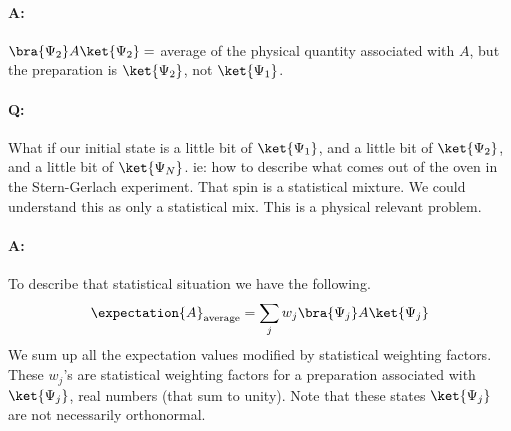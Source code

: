 \paragraph{A:}  \(\bra{\Psi_2} A \ket{\Psi_2} = \) average of the physical quantity associated with \(A\), but the preparation is \(\ket{\Psi_2}\), not \(\ket{\Psi_1}\).

\paragraph{Q:}  What if our initial state is a little bit of \(\ket{\Psi_1}\), and a little bit of \(\ket{\Psi_2}\), and a little bit of \(\ket{\Psi_N}\).  ie: how to describe what comes out of the oven in the Stern-Gerlach experiment.  That spin is a statistical mixture.  We could understand this as only a statistical mix.  This is a physical relevant problem.
\paragraph{A:}  To describe that statistical situation we have the following.
%
\begin{equation}\label{eqn:PHY356HNov2:30}
\begin{aligned}
\expectation{A}_{\text{average}} = \sum_j w_j \bra{\Psi_j} A \ket{\Psi_j}
\end{aligned}
\end{equation}
%
We sum up all the expectation values modified by statistical weighting factors.  These \(w_j\)'s are statistical weighting factors for a preparation associated with \(\ket{\Psi_j}\), real numbers (that sum to unity).  Note that these states \(\ket{\Psi_j}\) are not necessarily orthonormal.

